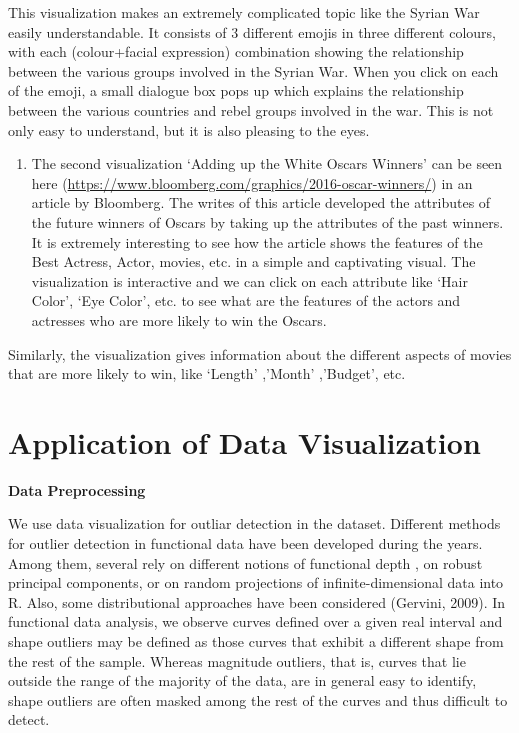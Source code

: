 \documentclass[]{book}
\providecommand{\tightlist}{%
  \setlength{\itemsep}{0pt}\setlength{\parskip}{0pt}}
\theoremstyle{definition}
\theoremstyle{definition}
\theoremstyle{definition}
\theoremstyle{remark}
\begin{document}
This visualization makes an extremely complicated topic like the Syrian
War easily understandable. It consists of 3 different emojis in three
different colours, with each (colour+facial expression) combination
showing the relationship between the various groups involved in the
Syrian War. When you click on each of the emoji, a small dialogue box
pops up which explains the relationship between the various countries
and rebel groups involved in the war. This is not only easy to
understand, but it is also pleasing to the eyes.

\begin{enumerate}
\def\labelenumi{\arabic{enumi}.}
\setcounter{enumi}{1}
\tightlist
\item
  The second visualization `Adding up the White Oscars Winners' can be
  seen here
  (\url{https://www.bloomberg.com/graphics/2016-oscar-winners/}) in an
  article by Bloomberg. The writes of this article developed the
  attributes of the future winners of Oscars by taking up the attributes
  of the past winners. It is extremely interesting to see how the
  article shows the features of the Best Actress, Actor, movies, etc. in
  a simple and captivating visual. The visualization is interactive and
  we can click on each attribute like `Hair Color', `Eye Color', etc. to
  see what are the features of the actors and actresses who are more
  likely to win the Oscars.
\end{enumerate}

Similarly, the visualization gives information about the different
aspects of movies that are more likely to win, like `Length' ,'Month'
,'Budget', etc.

\section{Application of Data
Visualization}\label{application-of-data-visualization}

\textbf{Data Preprocessing}

We use data visualization for outliar detection in the dataset.
Different methods for outlier detection in functional data have been
developed during the years. Among them, several rely on different
notions of functional depth , on robust principal components, or on
random projections of infinite-dimensional data into R. Also, some
distributional approaches have been considered (Gervini, 2009). In
functional data analysis, we observe curves defined over a given real
interval and shape outliers may be defined as those curves that exhibit
a different shape from the rest of the sample. Whereas magnitude
outliers, that is, curves that lie outside the range of the majority of
the data, are in general easy to identify, shape outliers are often
masked among the rest of the curves and thus difficult to detect.
\end{document}
